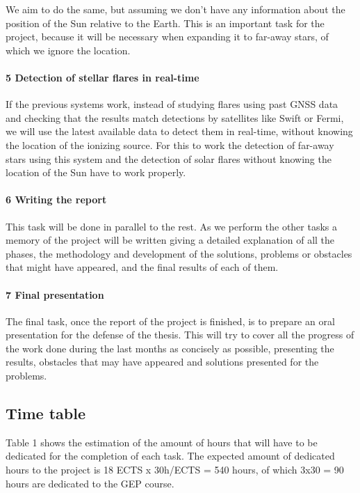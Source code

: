 We aim to do the same, but assuming we don’t have any information about the position of the Sun relative to the Earth. This is an important task for the project, because it will be necessary when expanding it to far-away stars, of which we ignore the location.

\paragraph{5 Detection of stellar flares in real-time}

If the previous systems work, instead of studying flares using past GNSS data and checking that the results match detections by satellites like Swift or Fermi, we will use the latest available data to detect them in real-time, without knowing the location of the ionizing source. For this to work the detection of far-away stars using this system and the detection of solar flares without knowing the location of the Sun have to work properly.

\paragraph{6 Writing the report}

This task will be done in parallel to the rest. As we perform the other tasks a memory of the project will be written giving a detailed explanation of all the phases, the methodology and development of the solutions, problems or obstacles that might have appeared, and the final results of each of them. 

\paragraph{7 Final presentation}

The final task, once the report of the project is finished, is to prepare an oral presentation for the defense of the thesis. This will try to cover all the progress of the work done during the last months as concisely as possible, presenting the results, obstacles that may have appeared and solutions presented for the problems.

\subsection{Time table}

Table 1 shows the estimation of the amount of hours that will have to be dedicated for the completion of each task. The expected amount of dedicated hours to the project is 18 ECTS x 30h/ECTS = 540 hours, of which 3x30 = 90 hours are dedicated to the GEP course.

